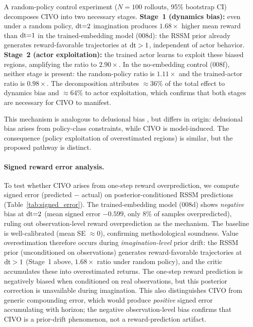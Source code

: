 A random-policy control experiment ($N{=}100$ rollouts, 95\% bootstrap CI) decomposes CIVO into two necessary stages.  \textbf{Stage~1 (dynamics bias):} even under a random policy, $\mathrm{dt}{=}2$ imagination produces $1.68\times$ higher mean reward than $\mathrm{dt}{=}1$ in the trained-embedding model (008d): the RSSM prior already generates reward-favorable trajectories at $\mathrm{dt} > 1$, independent of actor behavior.  \textbf{Stage~2 (actor exploitation):} the trained actor learns to exploit these biased regions, amplifying the ratio to $2.90\times$.  In the no-embedding control (008f), neither stage is present: the random-policy ratio is $1.11\times$ and the trained-actor ratio is $0.98\times$.  The decomposition attributes $\approx 36\%$ of the total effect to dynamics bias and $\approx 64\%$ to actor exploitation, which confirms that both stages are necessary for CIVO to manifest.

This mechanism is analogous to delusional bias \citep{lu2018nondelusional}, but differs in origin: delusional bias arises from policy-class constraints, while CIVO is model-induced.  The consequence (policy exploitation of overestimated regions) is similar, but the proposed pathway is distinct.

\paragraph{Signed reward error analysis.}
To test whether CIVO arises from one-step reward overprediction, we compute signed error (predicted $-$ actual) on posterior-conditioned RSSM predictions (Table~\ref{tab:signed_error}). The trained-embedding model (008d) shows \emph{negative} bias at $\mathrm{dt}{=}2$ (mean signed error $-0.599$, only 8\% of samples overpredicted), ruling out observation-level reward overprediction as the mechanism. The baseline is well-calibrated (mean SE $\approx 0$), confirming methodological soundness. Value overestimation therefore occurs during \emph{imagination-level} prior drift: the RSSM prior (unconditioned on observations) generates reward-favorable trajectories at $\mathrm{dt} > 1$ (Stage~1 above, $1.68\times$ ratio under random policy), and the critic accumulates these into overestimated returns. The one-step reward prediction is negatively biased when conditioned on real observations, but this posterior correction is unavailable during imagination. This also distinguishes CIVO from generic compounding error, which would produce \emph{positive} signed error accumulating with horizon; the negative observation-level bias confirms that CIVO is a prior-drift phenomenon, not a reward-prediction artifact.

